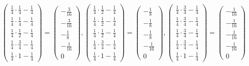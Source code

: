 \begin{solution}
    $$\left(\begin{array}{c} \frac14\cdot\frac14-\frac14 
                          \\ \frac14\cdot\frac14-\frac14
                          \\ \frac14\cdot\frac12-\frac14
                          \\ \frac14\cdot\frac34-\frac14
                          \\ \frac14\cdot1-\frac14
      \end{array}\right)
    =\left(\begin{array}{c} -\frac{3}{16}\\ -\frac{3}{16} \\ -\frac18
                         \\ -\frac{1}{16} \\ 0 \end{array}\right),
     \left(\begin{array}{c} \frac14\cdot\frac12-\frac14\\ \frac14\cdot\frac12-\frac14
                         \\ \frac14\cdot\frac12-\frac14 \\ \frac14\cdot\frac34-\frac14
                         \\ \frac14\cdot1-\frac14
     \end{array}\right)
    =\left(\begin{array}{c} -\frac{1}{8}\\ -\frac{1}{8} \\ -\frac18 \\ -\frac{1}{16} \\ 0 
     \end{array}\right),
     \left(\begin{array}{c} \frac14\cdot\frac34-\frac14\\ \frac14\cdot\frac34-\frac14
                         \\ \frac14\cdot\frac34-\frac14 \\ \frac14\cdot\frac34-\frac14
                         \\ \frac14\cdot1-\frac14 
     \end{array}\right)
    =\left(\begin{array}{c} -\frac{1}{16}\\ -\frac{1}{16} \\ -\frac{1}{16} \\ -\frac{1}{16} \\ 0
     \end{array}\right)$$
     

\end{solution}
